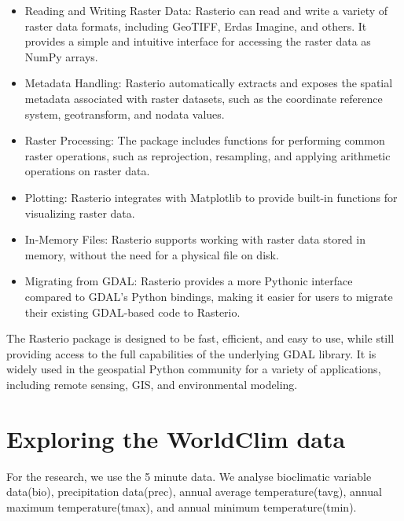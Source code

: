 \documentclass[a4paper,14pt] {report}
\begin{document}
	\begin{itemize}
		\item Reading and Writing Raster Data: Rasterio can read and write a variety of raster data formats, including GeoTIFF, Erdas Imagine, and others. It provides a simple and intuitive interface for accessing the raster data as NumPy arrays. 
		\item Metadata Handling: Rasterio automatically extracts and exposes the spatial metadata associated with raster datasets, such as the coordinate reference system, geotransform, and nodata values.
		\item Raster Processing: The package includes functions for performing common raster operations, such as reprojection, resampling, and applying arithmetic operations on raster data.
		\item Plotting: Rasterio integrates with Matplotlib to provide built-in functions for visualizing raster data.
		\item In-Memory Files: Rasterio supports working with raster data stored in memory, without the need for a physical file on disk.
		\item Migrating from GDAL: Rasterio provides a more Pythonic interface compared to GDAL's Python bindings, making it easier for users to migrate their existing GDAL-based code to Rasterio.
	\end{itemize}
	
	The Rasterio package is designed to be fast, efficient, and easy to use, while still providing access to the full capabilities of the underlying GDAL library. It is widely used in the geospatial Python community for a variety of applications, including remote sensing, GIS, and environmental modeling.
			
	\chapter{Exploring the WorldClim data}
	For the research, we use the 5 minute data.
	We analyse bioclimatic variable data(bio), precipitation data(prec), annual average temperature(tavg), annual maximum temperature(tmax), and annual minimum temperature(tmin). 
\end{document}
